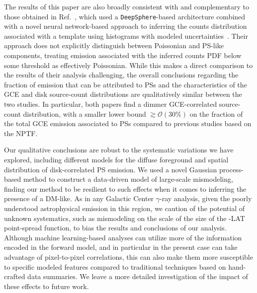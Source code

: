 \documentclass[prd,aps,10pt,nofootinbib,twocolumn,superscriptaddress,preprintnumbers,balancelastpage,longbibliography]{revtex4-1}
\begin{document}
The results of this paper are also broadly consistent with and complementary to those obtained in Ref.~\cite{List:2021aer}, which used a \texttt{DeepSphere}-based architecture combined with a novel neural network-based approach to inferring the counts distribution associated with a template using histograms with modeled uncertainties~\cite{list2021earth}. Their approach does not explicitly distinguish between Poissonian and PS-like components, treating emission associated with the inferred counts PDF below some threshold as effectively Poissonian. While this makes a direct comparison to the results of their analysis challenging, the overall conclusions regarding the fraction of emission that can be attributed to PSs and the characteristics of the GCE and disk source-count distributions are qualitatively similar between the two studies. In particular, both papers find a dimmer GCE-correlated source-count distribution, with a smaller lower bound $\gtrsim \mathcal O(30\%)$ on the fraction of the total GCE emission associated to PSs compared to previous studies based on the NPTF.

Our qualitative conclusions are robust to the systematic variations we have explored, including different models for the diffuse foreground and spatial distribution of disk-correlated PS emission. We used a novel Gaussian process-based method to construct a data-driven model of large-scale mismodeling, finding our method to be resilient to such effects when it comes to inferring the presence of a DM-like. As in any Galactic Center $\gamma$-ray analysis, given the poorly understood astrophysical emission in this region, we caution of the potential of unknown systematics, such as mismodeling on the scale of the size of the \Fermi-LAT point-spread function, to bias the results and conclusions of our analysis. Although machine learning-based analyses can utilize more of the information encoded in the forward model, and in particular in the present case can take advantage of pixel-to-pixel correlations, this can also make them more susceptible to specific modeled features compared to traditional techniques based on hand-crafted data summaries. We leave a more detailed investigation of the impact of these effects to future work.
\end{document}
